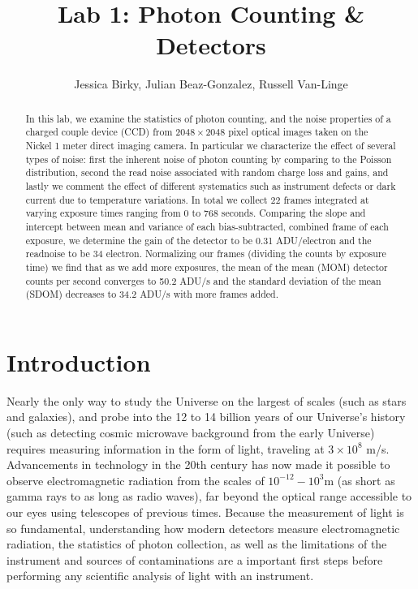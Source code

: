 \documentclass[preprint]{aastex62}
\begin{document}
\title{\sc Lab 1: Photon Counting \& Detectors}
\author{Jessica Birky, Julian Beaz-Gonzalez, Russell Van-Linge}


\begin{abstract}
In this lab, we examine the statistics of photon counting, and the noise properties of a charged couple device (CCD) from $2048\times2048$ pixel optical images taken on the Nickel 1 meter direct imaging camera. In particular we characterize the effect of several types of noise: first the inherent noise of photon counting by comparing to the Poisson distribution, second the read noise associated with random charge loss and gains, and lastly we comment the effect of different systematics such as instrument defects or dark current due to temperature variations. In total we collect 22 frames integrated at varying exposure times ranging from 0 to 768 seconds. Comparing the slope and intercept between mean and variance of each bias-subtracted, combined frame of each exposure, we determine the gain of the detector to be 0.31 ADU/electron and the readnoise to be 34 electron. Normalizing our frames (dividing the counts by exposure time) we find that as we add more exposures, the mean of the mean (MOM) detector counts per second converges to 50.2 ADU/s and the standard deviation of the mean (SDOM) decreases to 34.2 ADU/s with more frames added.

\end{abstract}
\bigskip

\section{Introduction} 
Nearly the only way to study the Universe on the largest of scales (such as stars and galaxies), and probe into the 12 to 14 billion years of our Universe's history (such as detecting cosmic microwave background from the early Universe) requires measuring information in the form of light, traveling at $3\times10^8$ m/s. Advancements in technology in the 20th century has now made it possible to observe electromagnetic radiation from the scales of $10^{-12}-10^3$m (as short as gamma rays to as long as radio waves), far beyond the optical range accessible to our eyes using telescopes of previous times. Because the measurement of light is so fundamental, understanding how modern detectors measure electromagnetic radiation, the statistics of photon collection, as well as the limitations of the instrument and sources of contaminations are a important first steps before performing any scientific analysis of light with an instrument.
\end{document}
